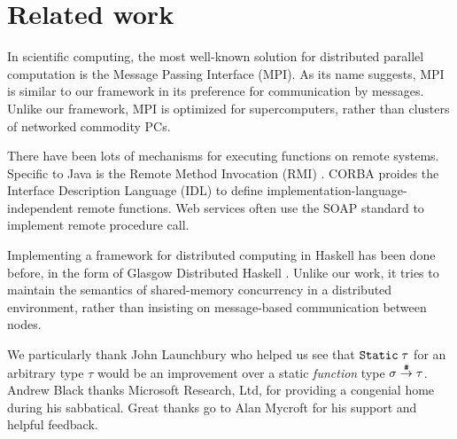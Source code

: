 \documentclass[preprint]{sigplanconf}
\begin{document}

\section{Related work}

In scientific computing, the most well-known solution for distributed parallel computation is the Message Passing Interface (MPI). As its name suggests, MPI is similar to our framework in its preference for communication by messages. Unlike our framework, MPI is optimized for supercomputers, rather than clusters of networked commodity PCs. 

There have been lots of mechanisms for executing functions on remote systems. Specific to Java is the Remote Method Invocation (RMI) \cite{javarmi}. CORBA proides the Interface Description Language (IDL) \cite{corbaidl} to define implementation-language-independent remote functions. Web services often use the SOAP standard to implement remote procedure call.

Implementing a framework for distributed computing in Haskell has been done before, in the form of Glasgow Distributed Haskell \cite{gdh2001}. Unlike our work, it tries to maintain the semantics of shared-memory concurrency in a distributed environment, rather than insisting on message-based communication between nodes.



\acks
We particularly thank John Launchbury who helped us see that $\text{\tt Static}\;\tau$ for an arbitrary type $\tau$
would be an improvement over a static \emph{function} type 
$\sigma \stackrel{\texttt{\#}}{\rightarrow} \tau$.  Andrew Black thanks Microsoft Research, Ltd, for providing a congenial home during his sabbatical.
Great thanks go to Alan Mycroft for his support and helpful feedback. 





%
%
%
\end{document}
